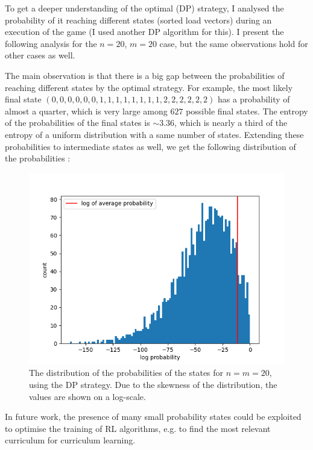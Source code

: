 To get a deeper understanding of the optimal (DP) strategy, I analysed the probability of it reaching different states (sorted load vectors) during an execution of the game (I used another DP algorithm for this). I present the following analysis for the $n=20$, $m=20$ case, but the same observations hold for other cases as well.

The main observation is that there is a big gap between the probabilities of reaching different states by the optimal strategy. For example, the most likely final state $(0, 0, 0, 0, 0, 0, 1, 1, 1, 1, 1, 1, 1, 1, 2, 2, 2, 2, 2, 2)$ has a probability of almost a quarter, which is very large among $627$ possible final states. The entropy of the probabilities of the final states is $\sim 3.36$, which is nearly a third of the entropy of a uniform distribution with a same number of states. Extending these probabilities to intermediate states as well, we get the following distribution of the probabilities :



\begin{figure}[hbt!] \label{two-thinning-state-distribution}
    \centering
    \includegraphics[scale=1.0]{Chapter4/Figs/state_distribution_20_20_all_log_count.png}
    \caption{The distribution of the probabilities of the states for $n=m=20$, using the DP strategy. Due to the skewness of the distribution, the values are shown on a log-scale.}
\end{figure}


In future work, the presence of many small probability states could be exploited to optimise the training of RL algorithms, e.g. to find the most relevant curriculum for curriculum learning. 


